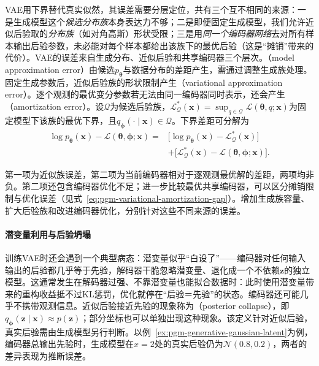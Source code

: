VAE用下界替代真实似然，其误差需要分层定位，共有三个互不相同的来源：一是生成模型这个\emph{候选分布族}本身表达力不够；二是即便固定生成模型，我们允许近似后验取的\emph{分布族}（如对角高斯）形状受限；三是用\emph{同一个编码器网络}去对所有样本输出后验参数，未必能对每个样本都给出该族下的最优后验（这是“摊销”带来的代价）。VAE的误差来自生成分布、近似后验和共享编码器三个层次。（model approximation error）由候选$p_{\bm{\theta}}$与数据分布的差距产生，需通过调整生成族处理。固定生成参数后，近似后验族的形状限制产生（variational approximation error）。逐个观测的最优变分参数若无法由同一编码器同时表示，还会产生（amortization error）。设$\mathcal{Q}$为候选后验族，$\mathcal{L}_{\mathcal{Q}}^*(\bm{x})=\sup_{q\in\mathcal{Q}}\mathcal{L}(\bm{\theta},q;\bm{x})$为固定模型下该族的最优下界，且$q_{\bm{\phi}}(\cdot\mid\bm{x})\in\mathcal{Q}$。下界差距可分解为
\begin{equation}
  \label{eq:pgm-generative-inference-gaps}
  \begin{aligned}
    \log p_{\bm{\theta}}(\bm{x})
      -\mathcal{L}(\bm{\theta},\bm{\phi};\bm{x})
    ={}&\bigl[\log p_{\bm{\theta}}(\bm{x})
             -\mathcal{L}_{\mathcal{Q}}^*(\bm{x})\bigr]\\
       &+\bigl[\mathcal{L}_{\mathcal{Q}}^*(\bm{x})
             -\mathcal{L}(\bm{\theta},\bm{\phi};\bm{x})\bigr].
  \end{aligned}
\end{equation}

第一项为近似族误差，第二项为当前编码器相对于逐观测最优解的差距，两项均非负。第二项还包含编码器优化不足；进一步比较最优共享编码器，可以区分摊销限制与优化误差（见式~\eqref{eq:pgm-variational-amortization-gap}）。增加生成族容量、扩大后验族和改进编码器优化，分别针对这些不同来源的误差。

\paragraph{潜变量利用与后验坍塌}

训练VAE时还会遇到一个典型病态：潜变量似乎“白设了”——编码器对任何输入输出的后验都几乎等于先验，解码器干脆忽略潜变量、退化成一个不依赖$\bm z$的独立模型。这通常发生在解码器过强、不靠潜变量也能拟合数据时：此时使用潜变量带来的重构收益抵不过KL惩罚，优化就停在“后验＝先验”的状态。编码器还可能几乎不携带观测信息。近似后验接近先验的现象称为（posterior collapse），即$q_{\bm{\phi}}(\bm{z}\mid\bm{x})\approx p(\bm{z})$；部分坐标也可以单独出现这种现象。该定义针对近似后验，真实后验需由生成模型另行判断。以例~\ref{ex:pgm-generative-gaussian-latent}为例，编码器总输出先验时，生成模型在$x=2$处的真实后验仍为$\mathcal{N}(0.8,0.2)$，两者的差异表现为推断误差。


